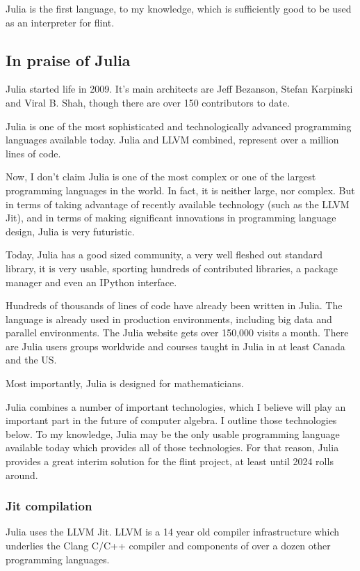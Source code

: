\documentclass[a4paper,10pt]{article}
\begin{document}
Julia is the first language, to my knowledge, which is sufficiently good to be used as an
interpreter for flint.

\subsection{In praise of Julia}

Julia started life in 2009. It's main architects are Jeff Bezanson, Stefan Karpinski and
Viral B. Shah, though there are over 150 contributors to date.

Julia is one of the most sophisticated and technologically advanced programming languages
available today. Julia and LLVM combined, represent over a million lines of code.

Now, I don't claim Julia is one of the most complex or one of the largest programming
languages in the world. In fact, it is neither large, nor complex. But in terms of taking 
advantage of recently available technology (such as the LLVM Jit), and in terms of making 
significant innovations in programming language design, Julia is very futuristic.

Today, Julia has a good sized community, a very well fleshed out standard library, it is very
usable, sporting hundreds of contributed libraries, a package manager and even an IPython
interface.

Hundreds of thousands of lines of code have already been written in Julia. The language is
already used in production environments, including big data and parallel environments. The
Julia website gets over 150,000 visits a month. There are Julia users groups worldwide and
courses taught in Julia in at least Canada and the US.

Most importantly, Julia is designed for mathematicians.

Julia combines a number of important technologies, which I believe will play an important part
in the future of computer algebra. I outline those technologies below. To my knowledge, Julia
may be the only usable programming language available today which provides all of those
technologies. For that reason, Julia provides a great interim solution for the flint project, 
at least until 2024 rolls around.

\subsubsection{Jit compilation}

Julia uses the LLVM Jit. LLVM is a 14 year old compiler infrastructure which underlies the 
Clang C/C++ compiler and components of over a dozen other programming languages.
\end{document}
